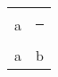 \documentclass{article}
\begin{document}
\begin{tabular}{m{3cm}|m{3cm}}
a & \rule{2cm}{2cm} \\
a & b
\end{tabular}
\end{document}
